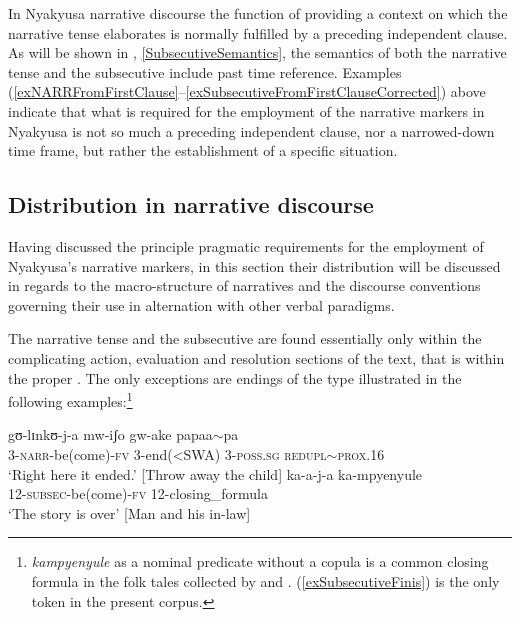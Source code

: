 In Nyakyusa narrative discourse the function of providing a context on which the narrative tense elaborates is normally fulfilled by a preceding independent clause. As will be shown in , \ref{SubsecutiveSemantics}, the semantics of both the narrative tense and the subsecutive include past time reference. Examples (\ref{exNARRFromFirstClause}--\ref{exSubsecutiveFromFirstClauseCorrected}) above indicate that what is required for the employment of the narrative markers in Nyakyusa is not so much a preceding independent clause, nor a narrowed-down time frame, but rather the establishment of a specific situation. 


\subsection{Distribution in narrative discourse}
\label{NarrativeMarkersUseDistribution}
Having discussed the principle pragmatic requirements for the employment of Nyakyusa's narrative markers, in this section their distribution will be discussed in regards to the macro-structure of narratives and the discourse conventions governing their use in alternation with other verbal paradigms.

The narrative tense and the subsecutive are found essentially only within the complicating action, evaluation and resolution sections of the text, that is within the  proper \citep[ch. 5]{FleischmanS1990}. The only exceptions are endings of the type illustrated in the following examples:\footnote{\textit{kampyenyule} as a nominal predicate without a copula is a common closing formula in the folk tales collected by \citet{BergerP1933} and \citet{BusseJ1942}. (\ref{exSubsecutiveFinis}) is the only token in the present corpus.}

\begin{exe}
	\ex \label{exNarrFinis}
	\gll gʊ-lɪnkʊ-j-a mw-iʃo gw-ake papaa$\sim$pa\\
	3-\textsc{narr}-be(come)-\textsc{fv} 3-end(<SWA) 3-\textsc{poss.sg} \textsc{redupl}$\sim$\textsc{prox.16}\\
	\glt \lq Right here it ended.' [Throw away the child]
	\ex \label{exSubsecutiveFinis}
	\gll ka-a-j-a ka-mpyenyule\\
	12-\textsc{subsec}-be(come)-\textsc{fv} 12-closing\_formula\\
	\glt \lq The story is over' [Man and his in-law]
\end{exe}

